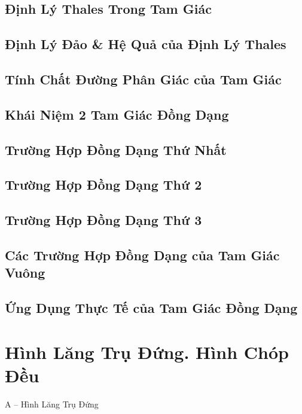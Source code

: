 \documentclass[oneside]{book}
\numberwithin{equation}{section}
\begin{document}
\section{Định Lý Thales Trong Tam Giác}

\section{Định Lý Đảo \& Hệ Quả của Định Lý Thales}

\section{Tính Chất Đường Phân Giác của Tam Giác}

\section{Khái Niệm 2 Tam Giác Đồng Dạng}

\section{Trường Hợp Đồng Dạng Thứ Nhất}

\section{Trường Hợp Đồng Dạng Thứ 2}

\section{Trường Hợp Đồng Dạng Thứ 3}

\section{Các Trường Hợp Đồng Dạng của Tam Giác Vuông}

\section{Ứng Dụng Thực Tế của Tam Giác Đồng Dạng}


\chapter{Hình Lăng Trụ Đứng. Hình Chóp Đều}

\begin{center}
	\Large A -- Hình Lăng Trụ Đứng
\end{center}
\end{document}
